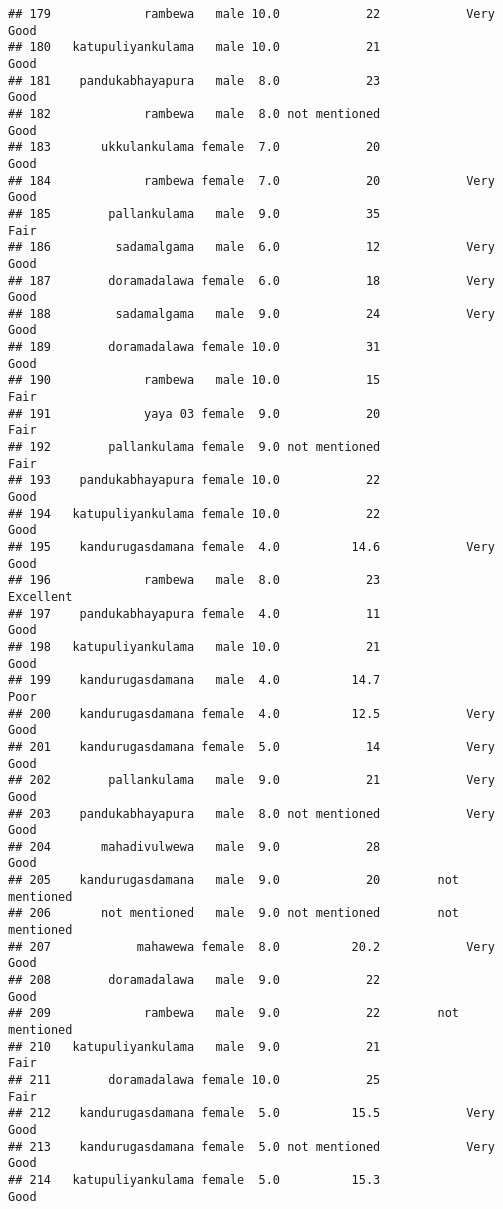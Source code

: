 \documentclass[
]{article}
\begin{document}
\begin{verbatim}
## 179             rambewa   male 10.0            22            Very Good
## 180   katupuliyankulama   male 10.0            21                 Good
## 181    pandukabhayapura   male  8.0            23                 Good
## 182             rambewa   male  8.0 not mentioned                 Good
## 183       ukkulankulama female  7.0            20                 Good
## 184             rambewa female  7.0            20            Very Good
## 185        pallankulama   male  9.0            35                 Fair
## 186         sadamalgama   male  6.0            12            Very Good
## 187        doramadalawa female  6.0            18            Very Good
## 188         sadamalgama   male  9.0            24            Very Good
## 189        doramadalawa female 10.0            31                 Good
## 190             rambewa   male 10.0            15                 Fair
## 191             yaya 03 female  9.0            20                 Fair
## 192        pallankulama female  9.0 not mentioned                 Fair
## 193    pandukabhayapura female 10.0            22                 Good
## 194   katupuliyankulama female 10.0            22                 Good
## 195    kandurugasdamana female  4.0          14.6            Very Good
## 196             rambewa   male  8.0            23            Excellent
## 197    pandukabhayapura female  4.0            11                 Good
## 198   katupuliyankulama   male 10.0            21                 Good
## 199    kandurugasdamana   male  4.0          14.7                 Poor
## 200    kandurugasdamana female  4.0          12.5            Very Good
## 201    kandurugasdamana female  5.0            14            Very Good
## 202        pallankulama   male  9.0            21            Very Good
## 203    pandukabhayapura   male  8.0 not mentioned            Very Good
## 204       mahadivulwewa   male  9.0            28                 Good
## 205    kandurugasdamana   male  9.0            20        not mentioned
## 206       not mentioned   male  9.0 not mentioned        not mentioned
## 207            mahawewa female  8.0          20.2            Very Good
## 208        doramadalawa   male  9.0            22                 Good
## 209             rambewa   male  9.0            22        not mentioned
## 210   katupuliyankulama   male  9.0            21                 Fair
## 211        doramadalawa female 10.0            25                 Fair
## 212    kandurugasdamana female  5.0          15.5            Very Good
## 213    kandurugasdamana female  5.0 not mentioned            Very Good
## 214   katupuliyankulama female  5.0          15.3                 Good

\end{verbatim}
\end{document}
